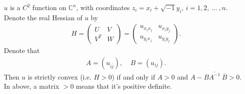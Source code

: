 \documentclass[10pt,a4paper]{amsart}
\newcommand{\EC}{\mathbb{C}}
\newcommand{\ijbar}{{i\overline j}}
\begin{document}
\begin{lemma}
	\label{lemma}
	 $u$ is a $C^2$ function on $\EC^n$, with coordinates $z_i=x_i+\sqrt{-1}y_i$, $i=1,2,\ ...\ ,n$. Denote the real Hessian of $u$ by 
	  \begin{align}
	  	  H=
	  	  \left(\begin{array}{cc}  U&V\\
	  	  V^T& W
	  	  \end{array}
	  	  \right)
	  	  =
	  	  \left(\begin{array}{cc}  u_{x_i x_j}& u_{x_i y_j}\\
	  	  	                                         u_{y_i x_j}& u_{y_i y_j}
	  	  	          \end{array}
	  	  \right).
	  \end{align}
	  Denote that 
	  \begin{align}
	  	A=\left(
	  	   u_{\ijbar}
	  	\right), \ \ \ \ \ B=\left(
	  	u_{ij}
	  	\right).
	  \end{align}
	  Then $u$ is strictly convex (i.e. $H>0$) if and only if $A>0$ and $A-B\overline{A^{-1}}\ \overline B>0$. In above, a matrix $>0$ means that it's positive definite.
\end{lemma}
\end{document}
